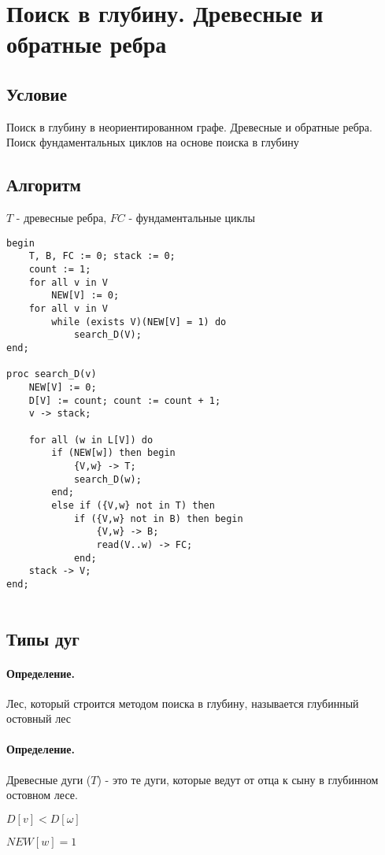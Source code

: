 \documentclass{report}
\begin{document}
\newpage

\section{Поиск в глубину. Древесные и обратные ребра}
\subsection{Условие}
Поиск в глубину в неориентированном графе. Древесные и обратные ребра. Поиск
фундаментальных циклов на основе поиска в глубину

\subsection{Алгоритм}

$T$ - древесные ребра,  $FC$ - фундаментальные  циклы

\begin{lstlisting}
begin
	T, B, FC := 0; stack := 0;
	count := 1;
	for all v in V
		NEW[V] := 0;
	for all v in V
		while (exists V)(NEW[V] = 1) do
			search_D(V);
end;

proc search_D(v)
	NEW[V] := 0;
	D[V] := count; count := count + 1;
	v -> stack;

	for all (w in L[V]) do
		if (NEW[w]) then begin
			{V,w} -> T;
			search_D(w);
		end;
		else if ({V,w} not in T) then
			if ({V,w} not in B) then begin
				{V,w} -> B;
				read(V..w) -> FC;
			end;
	stack -> V;
end;
		
\end{lstlisting}

\subsection{Типы дуг}

\paragraph*{Определение.}
Лес, который строится методом поиска в глубину, называется глубинный остовный лес

\paragraph*{Определение.}
Древесные дуги ($T$) - это те дуги, которые ведут от отца к сыну в глубинном остовном лесе.

$D[v] < D[\omega]$

$NEW[w] = 1$
\end{document}
